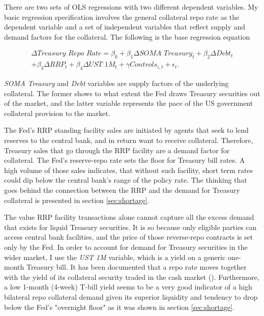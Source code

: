 \documentclass[11pt,a4paper,english,oneside]{article}
\begin{document}
There are two sets of OLS regressions with two different dependent variables. My basic regression specification involves the general collateral repo rate as the dependent variable and a set of independent variables that reflect supply and demand factors for the collateral. The following is the base regression equation

\begin{equation} \label{eq:1}
\begin{gathered}
\Delta \textit{Treasury Repo Rate} = \beta_0 + \beta_1 \Delta \textit{SOMA Treasury}_t + \beta_2 \Delta \textit{Debt}_t \\ + \beta_3 \Delta \textit{RRP}_t  + \beta_4 \Delta \textit{UST 1M}_t + \gamma \textit{Controls}_{i,t} + \epsilon_{t}.
\end{gathered}
\end{equation}

\emph{SOMA Treasury} and \emph{Debt} variables are supply factors of the underlying collateral. The former shows to what extent the Fed draws Treasury securities out of the market, and the latter variable represents the pace of the US government collateral provision to the market.

The Fed's RRP standing facility sales are initiated by agents that seek to lend reserves to the central bank, and in return want to receive collateral. Therefore, Treasury sales that go through the RRP facility are a demand factor for collateral. The Fed's reserve-repo rate sets the floor for Treasury bill rates. A high volume of those sales indicates, that without such facility, short term rates could dip below the central bank's range of the policy rate. The thinking that goes behind the connection between the RRP and the demand for Treasury collateral is presented in section \ref{sec:shortage}.

The value RRP facility transactions alone cannot capture all the excess demand that exists for liquid Treasury securities. It is so because only eligible parties can access central bank facilities, and the price of those reverse-repo contracts is set only by the Fed. In order to account for demand for Treasury securities in the wider market, I use the \emph{UST 1M} variable, which is a yield on a generic one-month Treasury bill. It has been documented that a repo rate moves together with the yield of its collateral security traded in the cash market (\citealp{bartolini2011,nyborg2019a}). Furthermore, a low 1-month (4-week) T-bill yield seems to be a very good indicator of a high bilateral repo collateral demand given its superior liquidity and tendency to drop below the Fed's "overnight floor" as it was shown in section \ref{sec:shortage}.
\end{document}
